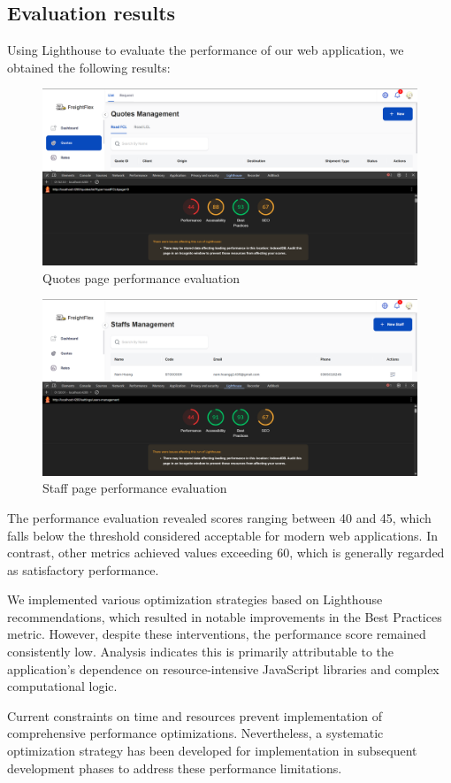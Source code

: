 \subsection{Evaluation results}
Using Lighthouse to evaluate the performance of our web application, we obtained the following results:
\begin{figure}[H]
  \centering
  \includegraphics[width=15cm]{graphics/chapter6/quotes.png}
  \caption{Quotes page performance evaluation}
  \label{fig:quotes}
\end{figure}

\begin{figure}[H]
  \centering
  \includegraphics[width=15cm]{graphics/chapter6/staff_before.png}
  \caption{Staff page performance evaluation}
  \label{fig:staff_before}
\end{figure}

\noindent The performance evaluation revealed scores ranging between 40 and 45, which falls below the threshold considered acceptable for modern web applications. In contrast, other metrics achieved values exceeding 60, which is generally regarded as satisfactory performance.

We implemented various optimization strategies based on Lighthouse recommendations, which resulted in notable improvements in the Best Practices metric. However, despite these interventions, the performance score remained consistently low. Analysis indicates this is primarily attributable to the application's dependence on resource-intensive JavaScript libraries and complex computational logic.

Current constraints on time and resources prevent implementation of comprehensive performance optimizations. Nevertheless, a systematic optimization strategy has been developed for implementation in subsequent development phases to address these performance limitations.

